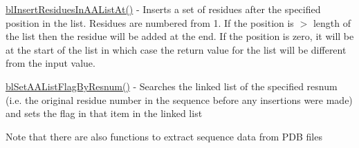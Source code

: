 \begin{DoxyItemize}
\item \hyperlink{aalist_8c_a830167609ac35df9a6950f4c09c5fc0e}{bl\-Insert\-Residues\-In\-A\-A\-List\-At()} -\/ Inserts a set of residues after the specified position in the list. Residues are numbered from 1. If the position is $>$ length of the list then the residue will be added at the end. If the position is zero, it will be at the start of the list in which case the return value for the list will be different from the input value.
\item \hyperlink{aalist_8c_aa3085ff05d331b03a7f0aad5684f48bc}{bl\-Set\-A\-A\-List\-Flag\-By\-Resnum()} -\/ Searches the linked list of the specified resnum (i.\-e. the original residue number in the sequence before any insertions were made) and sets the flag in that item in the linked list
\end{DoxyItemize}

Note that there are also functions to extract sequence data from P\-D\-B files 